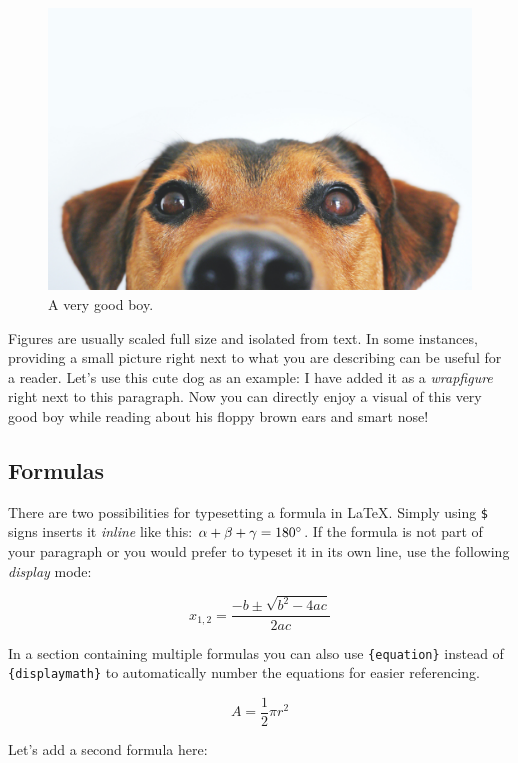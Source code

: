 \begin{figure}
    \centering
    \includegraphics[width=0.8\linewidth]{Figures/dog.jpg}
	\caption{A very good boy.}
	\label{dog}
\end{figure}

Figures are usually scaled full size and isolated from text. In some instances, providing a small picture right next to what you are describing can be useful for a reader. Let's use this cute dog as an example: I have added it as a \textit{wrapfigure} right next to this paragraph. Now you can directly enjoy a visual of this very good boy while reading about his floppy brown ears and smart nose!


\subsection{Formulas}
There are two possibilities for typesetting a formula in \LaTeX. Simply using \verb+$+ signs inserts it \textit{inline} like this:  $\alpha + \beta + \gamma = 180\degree$. If the formula is not part of your paragraph or you would prefer to typeset it in its own line, use the following \textit{display} mode:

\begin{displaymath}
x_{1,2} = \frac{-b \pm \sqrt{b^2-4ac}}{2ac} 
\end{displaymath}

In a section containing multiple formulas you can also use \verb+{equation}+ instead of \verb+{displaymath}+ to automatically number the equations for easier referencing.

\begin{equation}
A = \frac{1}{2} \pi r^2
\end{equation}

Let's add a second formula here:

